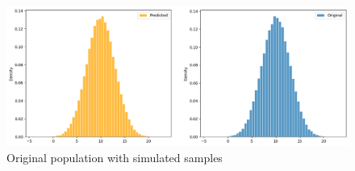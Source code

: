 \begin{example}
	\begin{figure}[H]
		\centering
		\includegraphics[width=1\textwidth]{images/metropolis/example2/original-with-simulated.png}
		\caption{Original population with simulated samples}
	\end{figure}

\end{example}







